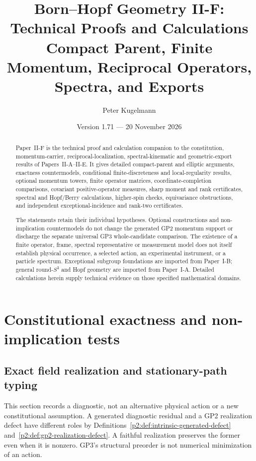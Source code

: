 \documentclass[11pt,a4paper]{article}
\title{\textbf{Born--Hopf Geometry II-F: Technical Proofs and Calculations}\\[0.5em]
\large Compact Parent, Finite Momentum, Reciprocal Operators, Spectra, and Exports}
\author{Peter Kugelmann}
\date{Version 1.71 --- 20 November 2026}
\begin{document}
\maketitle
\begin{abstract}
Paper~II-F is the technical proof and calculation companion to the
constitution, momentum-carrier, reciprocal-localization, spectral-kinematic
and geometric-export results of Papers~II-A--II-E.  It gives detailed
compact-parent and elliptic arguments, exactness countermodels, conditional
finite-discreteness and local-regularity results, optional momentum towers,
finite operator matrices, coordinate-completion comparisons, covariant
positive-operator measures, sharp moment and rank certificates, spectral and
Hopf/Berry calculations, higher-spin checks, equivariance obstructions, and
independent exceptional-incidence and rank-two certificates.

The statements retain their individual hypotheses.  Optional constructions
and non-implication countermodels do not change the generated GP2 momentum
support or discharge the separate universal GP3 whole-candidate comparison.
The existence of a finite operator, frame, spectral representative or
measurement model does not itself establish physical occurrence, a selected
action, an experimental instrument, or a particle spectrum.  Exceptional
subgroup foundations are imported from Paper~I-B; general round-$S^3$ and
Hopf geometry are imported from Paper~I-A.  Detailed calculations herein
supply technical evidence on those specified mathematical domains.
\end{abstract}
\tableofcontents
\clearpage

\section{Constitutional exactness and non-implication tests}
\label{p2ftech:sec:constitution}

\subsection{Exact field realization and stationary-path typing}
\label{p2a:app:v2190-exactness-stationarity}

This section records a diagnostic, not an alternative physical action or
a new constitutional assumption.  A generated diagnostic residual and a
GP2 realization defect have different roles by
Definitions~\ref{p2:def:intrinsic-generated-defect}
and~\ref{p2:def:gp2-realization-defect}.  A faithful realization preserves
the former even when it is nonzero.  GP3's structural preorder is not
numerical minimization of an action.
\end{document}

